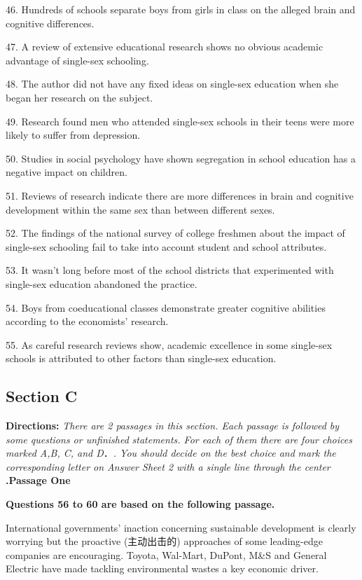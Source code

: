 \documentclass[UTF8,11pt]{ctexart}
\begin{document}
46. Hundreds of schools separate boys from girls in class on the alleged brain and cognitive differences.


47. A review of extensive educational research shows no obvious academic advantage of single-sex schooling.


48. The author did not have any fixed ideas on single-sex education when she began her research on the subject.


49. Research found men who attended single-sex schools in their teens were more likely to suffer from depression.


50. Studies in social psychology have shown segregation in school education has a negative impact on children.


51. Reviews of research indicate there are more differences in brain and cognitive development within the same sex than between different sexes.


52. The findings of the national survey of college freshmen about the impact of single-sex schooling fail to take into account student and school attributes.


53. It wasn't long before most of the school districts that experimented with single-sex education abandoned the practice.


54. Boys from coeducational classes demonstrate greater cognitive abilities according to the economists' research.


55. As careful research reviews show, academic excellence in some single-sex schools is attributed to other factors than single-sex education.


\subsection*{\textbf{Section C}}


\textbf{Directions:}\textit{ There are 2 passages in this section. Each passage is followed by some questions or unfinished} \textit{statements. For each of them there are four choices marked A,B, C, and D}．\textit{. You should decide on the best choice and} \textit{mark the corresponding letter on Answer Sheet 2 with a single line through the center} \textbf{.Passage One}


\textbf{Questions 56 to 60 are based on the following passage.}


International governments' inaction concerning sustainable development is clearly worrying but the proactive (主动出击的) approaches of some leading-edge companies are encouraging. Toyota, Wal-Mart, DuPont, M\&S and General Electric have made tackling environmental wastes a key economic driver.
\end{document}

